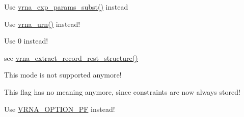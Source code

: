 \begin{DoxyRefList}
\item[\label{deprecated__deprecated000106}%
\hypertarget{deprecated__deprecated000106}{}%
Global \hyperlink{group__pf__fold_gaafe2d1b21f5418b123b088aa395e827d}{update\+\_\+pf\+\_\+params\+\_\+par} (int length, vrna\+\_\+exp\+\_\+param\+\_\+t $\ast$parameters)]Use \hyperlink{group__energy__parameters_ga8e7ac4fab3b0cc03afbc134eaafb3525}{vrna\+\_\+exp\+\_\+params\+\_\+subst()} instead


\item[\label{deprecated__deprecated000162}%
\hypertarget{deprecated__deprecated000162}{}%
Global \hyperlink{utils_8h_aaa328491c84996e445d027fde9800f2e}{urn} (void)]Use \hyperlink{group__utils_ga384e256ebb295d04a14426179db0dd6e}{vrna\+\_\+urn()} instead!  
\item[\label{deprecated__deprecated000039}%
\hypertarget{deprecated__deprecated000039}{}%
Global \hyperlink{group__constraints_ga62e0ed0c33002c09423de4e646f85a2b}{V\+R\+N\+A\+\_\+\+C\+O\+N\+S\+T\+R\+A\+I\+N\+T\+\_\+\+F\+I\+LE} ]Use 0 instead!


\item[\label{deprecated__deprecated000065}%
\hypertarget{deprecated__deprecated000065}{}%
Global \hyperlink{file__formats_8h_a7d725ef525b29891abef3f1ed42599a4}{V\+R\+N\+A\+\_\+\+C\+O\+N\+S\+T\+R\+A\+I\+N\+T\+\_\+\+M\+U\+L\+T\+I\+L\+I\+NE} ]see \hyperlink{file__formats_8h_ad37cbb63a05eed63ba25c91628409be0}{vrna\+\_\+extract\+\_\+record\+\_\+rest\+\_\+structure()}  
\item[\label{deprecated__deprecated000042}%
\hypertarget{deprecated__deprecated000042}{}%
Global \hyperlink{constraints__hard_8h_a08d12a9a846ea593b7171d277c9f033f}{V\+R\+N\+A\+\_\+\+C\+O\+N\+S\+T\+R\+A\+I\+N\+T\+\_\+\+N\+O\+\_\+\+H\+E\+A\+D\+ER} ]This mode is not supported anymore! 
\item[\label{deprecated__deprecated000040}%
\hypertarget{deprecated__deprecated000040}{}%
Global \hyperlink{group__constraints_ga62aa195893d02d1a79ca94952748df36}{V\+R\+N\+A\+\_\+\+C\+O\+N\+S\+T\+R\+A\+I\+N\+T\+\_\+\+S\+O\+F\+T\+\_\+\+M\+FE} ]This flag has no meaning anymore, since constraints are now always stored!


\item[\label{deprecated__deprecated000041}%
\hypertarget{deprecated__deprecated000041}{}%
Global \hyperlink{group__constraints_ga03fb5000c19b9a2082bf4ea30a543045}{V\+R\+N\+A\+\_\+\+C\+O\+N\+S\+T\+R\+A\+I\+N\+T\+\_\+\+S\+O\+F\+T\+\_\+\+PF} ]Use \hyperlink{group__fold__compound_gabfbadcddda3e74ce7f49035ef8f058f7}{V\+R\+N\+A\+\_\+\+O\+P\+T\+I\+O\+N\+\_\+\+PF} instead!



\end{DoxyRefList}

